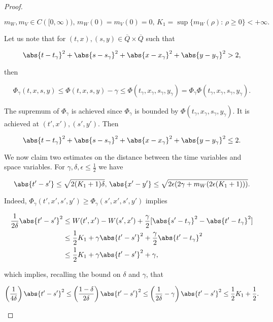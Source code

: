 \begin{proof}
\begin{enumerate}
        \[m_W,m_V\in C([0,\infty)),\, m_W(0)=m_V(0)=0,\, K_1=\sup\{m_W(\rho):\,\rho\geq0\}<+\infty.\]

        Let us note that for $(t,x),(s,y)\in\overline{Q}\times\overline{Q}$ such that 

        \[\abs{t-t_{\gamma}}^2+\abs{s-s_{\gamma}}^2 + \abs{x-x_{\gamma}}^2 + \abs{y-y_{\gamma}}^2>2,\]

        then

        \[\Phi_{\gamma}(t,x,s,y) \leq \Phi(t,x,s,y) - \gamma \leq \Phi(t_{\gamma},x_{\gamma},s_{\gamma},y_{\gamma}) = \Phi_{\gamma}\Phi(t_{\gamma},x_{\gamma},s_{\gamma},y_{\gamma}).\]

        The supremum of $\Phi_{\gamma}$ is achieved since $\Phi_{\gamma}$ is bounded by $\Phi(t_{\gamma},x_{\gamma},s_{\gamma},y_{\gamma})$. It is achieved at $(t',x'),(s',y')$. Then

        \begin{equation}
            \abs{t-t_{\gamma}}^2+\abs{s-s_{\gamma}}^2 + \abs{x-x_{\gamma}}^2 + \abs{y-y_{\gamma}}^2\leq2.
        \end{equation}

        We now claim two estimates on the distance between the time variables and space variables. For $\gamma,\delta,\epsilon\leq\frac{1}{2}$ we have

        \begin{equation}\label{4-2-inproofSup:unboundedCLAIMS}
            \abs{t'-s'} \leq \sqrt{2(K_1+1)\delta},\,\abs{x'-y'}\leq\sqrt{2\epsilon(2\gamma + m_W(2\epsilon(K_1+1)))}.
        \end{equation}

        Indeed, $\Phi_{\gamma}(t',x',s',y')\geq\Phi_{\gamma}(s',x',s',y')$ implies

        \begin{align*}
            \frac{1}{2\delta}\abs{t'-s'}^2 & \leq W(t',x')-W(s',x') + \frac{\gamma}{2}[\abs{s'-t_{\gamma}}^2-\abs{t'-t_{\gamma}}^2] \\
            & \leq \frac{1}{2}K_1 + \gamma\abs{t'-s'}^2 + \frac{\gamma}{2}\abs{t'-t_{\gamma}}^2 \\
            & \leq \frac{1}{2}K_1 + \gamma\abs{t'-s'}^2 + \gamma,
        \end{align*}

        which implies, recalling the bound on $\delta$ and $\gamma$, that 

        \[\left(\frac{1}{4\delta}\right)\abs{t'-s'}^2\leq\left(\frac{1-\delta}{2\delta}\right)\abs{t'-s'}^2\leq\left(\frac{1}{2\delta}-\gamma\right)\abs{t'-s'}^2\leq \frac{1}{2}K_1 + \frac{1}{2}.\]


\end{enumerate}
\end{proof}
